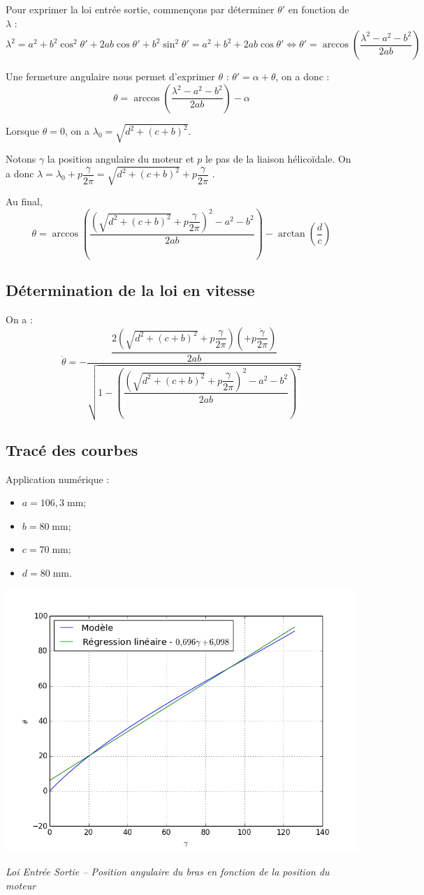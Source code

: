 \documentclass[10pt,fleqn]{article} %
\begin{document}
Pour exprimer la loi entrée sortie, commençons par déterminer $\theta'$ en fonction de $\lambda$ : 
$$
\lambda^2 
=  a^2 +b^2\cos^2\theta' + 2ab\cos\theta'  + b^2\sin^2 \theta'
=  a^2 +b^2 + 2ab\cos\theta' 
\Longleftrightarrow 
\theta' = \arccos \left(\dfrac{\lambda^2 - a^2 - b^2 }{2ab} \right)
$$

Une fermeture angulaire nous permet d'exprimer $\theta$ : $\theta' = \alpha + \theta$, on a donc :
$$
\theta = \arccos \left(\dfrac{\lambda^2 - a^2 - b^2 }{2ab} \right) - \alpha
$$

Lorsque $\theta=0$, on a $\lambda_0 = \sqrt{d^2 + (c+b)^2}$.


Notons $\gamma$ la position angulaire du moteur et $p$ le pas de la liaison hélicoïdale. On a donc $\lambda = \lambda_0 + p \dfrac{\gamma}{2\pi}=\sqrt{d^2 + (c+b)^2} + p \dfrac{\gamma}{2\pi}$ .

Au final, 
$$
\theta = \arccos \left(\dfrac{\left( \sqrt{d^2 + (c+b)^2} + p \dfrac{\gamma}{2\pi}\right)^2 - a^2 - b^2 }{2ab} \right) - \arctan\left( \dfrac{d}{c}\right)
$$

\subsection{Détermination de la loi en vitesse}

On a :
$$
\dot{\theta} = -\dfrac{\dfrac{2\left( \sqrt{d^2 + (c+b)^2} + p \dfrac{\gamma}{2\pi}\right) \left( + p \dfrac{\dot{\gamma}}{2\pi}\right)  }{2ab} }{\sqrt{1-\left(\dfrac{\left( \sqrt{d^2 + (c+b)^2} + p \dfrac{\gamma}{2\pi}\right)^2 - a^2 - b^2 }{2ab} \right)^2}}
$$

\subsection{Tracé des courbes} 
Application numérique : 
\begin{itemize}
\item $a = 106,3\; \text{mm}$;
\item $b = 80 \; \text{mm}$;
\item $c = 70 \; \text{mm}$;
\item $d = 80 \; \text{mm}$.
\end{itemize}

\begin{center}
\includegraphics[width=.45\textwidth]{images/LoiTheorique}

\textit{Loi Entrée Sortie -- Position angulaire du bras en fonction de la position du moteur} 
\end{center}
\end{document}
